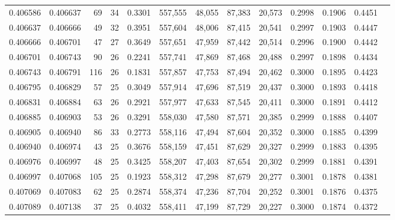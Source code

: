 \begin{tabular}{rrrrrrrrrrrrr}
0.406586 & 0.406637 &    69 &  34 &                                     0.3301 & 557,555 &  48,055 &  87,383 &  20,573 & 0.2998 & 0.1906 & 0.4451 \\
0.406637 & 0.406666 &    49 &  32 &                                     0.3951 & 557,604 &  48,006 &  87,415 &  20,541 & 0.2997 & 0.1903 & 0.4447 \\
0.406666 & 0.406701 &    47 &  27 &                                     0.3649 & 557,651 &  47,959 &  87,442 &  20,514 & 0.2996 & 0.1900 & 0.4442 \\
0.406701 & 0.406743 &    90 &  26 &                                     0.2241 & 557,741 &  47,869 &  87,468 &  20,488 & 0.2997 & 0.1898 & 0.4434 \\
0.406743 & 0.406791 &   116 &  26 &                                     0.1831 & 557,857 &  47,753 &  87,494 &  20,462 & 0.3000 & 0.1895 & 0.4423 \\
0.406795 & 0.406829 &    57 &  25 &                                     0.3049 & 557,914 &  47,696 &  87,519 &  20,437 & 0.3000 & 0.1893 & 0.4418 \\
0.406831 & 0.406884 &    63 &  26 &                                     0.2921 & 557,977 &  47,633 &  87,545 &  20,411 & 0.3000 & 0.1891 & 0.4412 \\
0.406885 & 0.406903 &    53 &  26 &                                     0.3291 & 558,030 &  47,580 &  87,571 &  20,385 & 0.2999 & 0.1888 & 0.4407 \\
0.406905 & 0.406940 &    86 &  33 &                                     0.2773 & 558,116 &  47,494 &  87,604 &  20,352 & 0.3000 & 0.1885 & 0.4399 \\
0.406940 & 0.406974 &    43 &  25 &                                     0.3676 & 558,159 &  47,451 &  87,629 &  20,327 & 0.2999 & 0.1883 & 0.4395 \\
0.406976 & 0.406997 &    48 &  25 &                                     0.3425 & 558,207 &  47,403 &  87,654 &  20,302 & 0.2999 & 0.1881 & 0.4391 \\
0.406997 & 0.407068 &   105 &  25 &                                     0.1923 & 558,312 &  47,298 &  87,679 &  20,277 & 0.3001 & 0.1878 & 0.4381 \\
0.407069 & 0.407083 &    62 &  25 &                                     0.2874 & 558,374 &  47,236 &  87,704 &  20,252 & 0.3001 & 0.1876 & 0.4375 \\
0.407089 & 0.407138 &    37 &  25 &                                     0.4032 & 558,411 &  47,199 &  87,729 &  20,227 & 0.3000 & 0.1874 & 0.4372 \\

\end{tabular}
